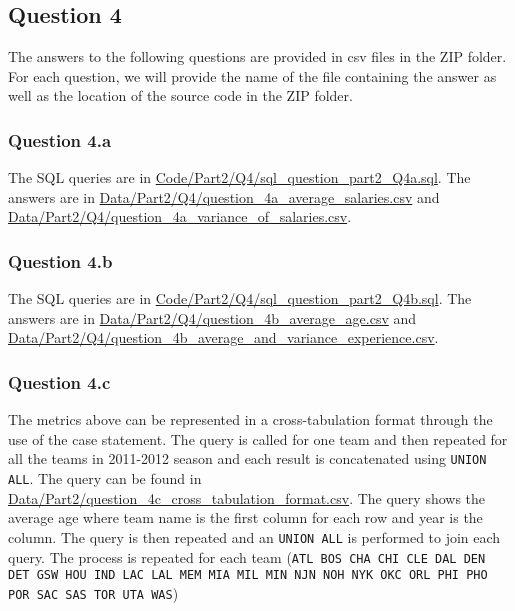 
\subsection{Question 4}
\label{subsec:414}

The answers to the following questions are provided in csv files in the ZIP folder. For each question, we will provide the name of the file containing the answer as well as the location of the source code in the ZIP folder.

\subsubsection{Question 4.a}
\label{subsubsec:414a}

The SQL queries are in \url{Code/Part2/Q4/sql_question_part2_Q4a.sql}. The answers are in \url{Data/Part2/Q4/question_4a_average_salaries.csv} and \url{Data/Part2/Q4/question_4a_variance_of_salaries.csv}.

\subsubsection{Question 4.b}
\label{subsubsec:414b}

The SQL queries are in \url{Code/Part2/Q4/sql_question_part2_Q4b.sql}. The answers are in \url{Data/Part2/Q4/question_4b_average_age.csv} and \url{Data/Part2/Q4/question_4b_average_and_variance_experience.csv}.

\subsubsection{Question 4.c}
\label{subsubsec:414c}

The metrics above can be represented in a cross-tabulation format through the use of the case statement. The query is called for one team and then repeated for all the teams in 2011-2012 season and each result is concatenated using \verb|UNION ALL|. The query can be found in \url{Data/Part2/question_4c_cross_tabulation_format.csv}.
The query shows the average age where team name is the first column for each row and year is the column. The query is then repeated and an \verb|UNION ALL| is performed to join each query. The process is repeated for each team (\verb|ATL BOS CHA CHI CLE DAL DEN DET GSW HOU IND LAC LAL MEM MIA MIL MIN NJN NOH NYK OKC ORL PHI PHO POR SAC SAS TOR UTA WAS|)
